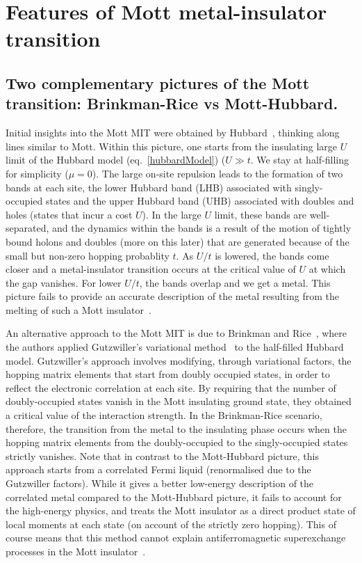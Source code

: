 \section{Features of Mott metal-insulator transition}
\subsection{Two complementary pictures of the Mott transition: Brinkman-Rice vs Mott-Hubbard.} Initial insights into the Mott MIT were obtained by Hubbard~\cite{hubbard1963electron}, thinking along lines similar to Mott. Within this picture, one starts from the insulating large \(U\) limit of the Hubbard model (eq.~\ref{hubbardModel}) (\(U \gg t\). We stay at half-filling for simplicity (\(\mu = 0\)). The large on-site repulsion leads to the formation of two bands at each site, the lower Hubbard band (LHB) associated with singly-occupied  states and the upper Hubbard band (UHB) associated with doubles and holes (states that incur a cost \(U\)). In the large \(U\) limit, these bands are well-separated, and the dynamics within the bands is a result of the motion of tightly bound holons and doubles (more on this later) that are generated because of the small but non-zero hopping probablity \(t\). As \(U/t\) is lowered, the bands come closer and a metal-insulator transition occurs at the critical value of \(U\) at which the gap vanishes. For lower \(U/t\), the bands overlap and we get a metal. This picture fails to provide an accurate description of the metal resulting from the melting of such a Mott insulator~\cite{georges1996}.

An alternative approach to the Mott MIT is due to Brinkman and Rice~\cite{brinkman_rice_1970}, where the authors applied Gutzwiller's variational method~\cite{Gutzwiller1965} to the half-filled Hubbard model. Gutzwiller's approach involves modifying, through variational factors, the hopping matrix elements that start from doubly occupied states, in order to reflect the electronic correlation at each site. By requiring that the number of doubly-occupied states vanish in the Mott insulating ground state, they obtained a critical value of the interaction strength. In the Brinkman-Rice scenario, therefore, the transition from the metal to the insulating phase occurs when the hopping matrix elements from the doubly-occupied to the singly-occupied states strictly vanishes. Note that in contrast to the Mott-Hubbard picture, this approach starts from a correlated Fermi liquid (renormalised due to the Gutzwiller factors). While it gives a better low-energy description of the correlated metal compared to the Mott-Hubbard picture, it fails to account for the high-energy physics, and treats the Mott insulator as a direct product state of local moments at each state (on account of the strictly zero hopping). This of course means that this method cannot explain antiferromagnetic superexchange processes in the Mott insulator~\cite{georges1996}.

